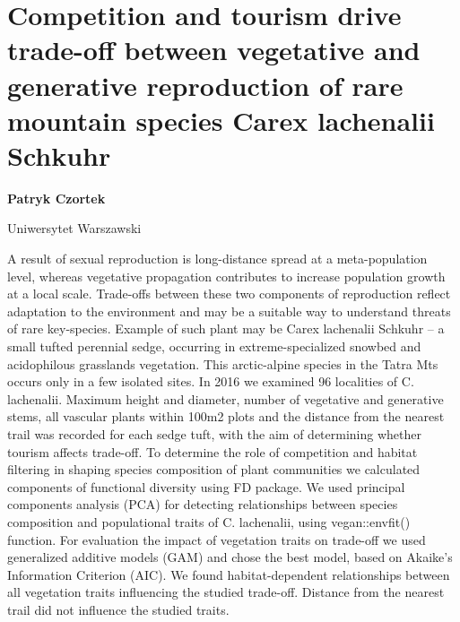 \documentclass[\main/boa.tex]{subfiles}
\begin{document}
\section{Competition and tourism drive trade-off between vegetative and generative reproduction of rare mountain species Carex lachenalii Schkuhr}

\begin{minipage}{0.915\textwidth}
	\centering
  {\bf {} Patryk Czortek}
\end{minipage}


\begin{affiliations}
\begin{minipage}{0.915\textwidth}
\centering
Uniwersytet Warszawski  \\[-2pt]
\end{minipage}
\end{affiliations}

\vskip 0.3cm

 A result of sexual reproduction is long-distance spread at a meta-population level, whereas vegetative propagation contributes to increase population growth at a local scale. Trade-offs between these two components of reproduction reflect adaptation to the environment and may be a suitable way to understand threats of rare key-species. Example of such plant may be Carex lachenalii Schkuhr – a small tufted perennial sedge, occurring in extreme-specialized snowbed and acidophilous grasslands vegetation. This arctic-alpine species in the Tatra Mts occurs only in a few isolated sites. In 2016 we examined 96 localities of C. lachenalii. Maximum height and diameter, number of vegetative and generative stems, all vascular plants within 100m2 plots and the distance from the nearest trail was recorded for each sedge tuft, with the aim of determining whether tourism affects trade-off. To determine the role of competition and habitat filtering in shaping species composition of plant communities we calculated components of functional diversity using FD package. We used principal components analysis (PCA) for detecting relationships between species composition and populational traits of C. lachenalii, using vegan::envfit() function. For evaluation the impact of vegetation traits on trade-off we used generalized additive models (GAM) and chose the best model, based on Akaike’s Information Criterion (AIC). We found habitat-dependent relationships between all vegetation traits influencing the studied trade-off. Distance from the nearest trail did not influence the studied traits. 
\end{document}
